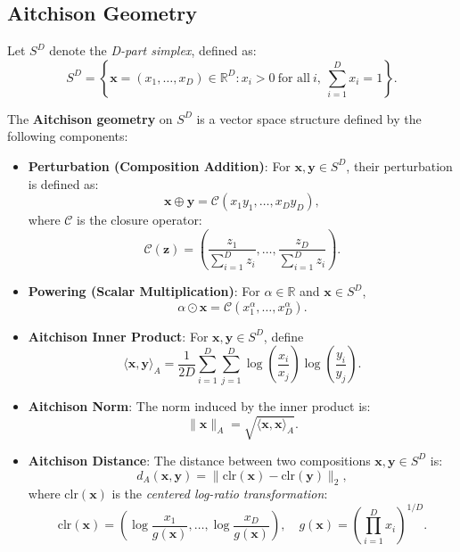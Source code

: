 \documentclass[article]{abntex2}
\begin{document}
\subsection*{Aitchison Geometry}

Let $S^D$ denote the \emph{D-part simplex}, defined as:
\[
S^D = \left\{ \mathbf{x} = (x_1, \dots, x_D) \in \mathbb{R}^D : x_i > 0 \ \text{for all} \ i, \ \sum_{i=1}^D x_i = 1 \right\}.
\]

The \textbf{Aitchison geometry} on $S^D$ is a vector space structure defined by the following components:

\begin{itemize}
    \item \textbf{Perturbation (Composition Addition)}: For $\mathbf{x}, \mathbf{y} \in S^D$, their perturbation is defined as:
    \[
    \mathbf{x} \oplus \mathbf{y} = \mathcal{C}(x_1 y_1, \dots, x_D y_D),
    \]
    where $\mathcal{C}$ is the closure operator:
    \[
    \mathcal{C}(\mathbf{z}) = \left( \frac{z_1}{\sum_{i=1}^D z_i}, \dots, \frac{z_D}{\sum_{i=1}^D z_i} \right).
    \]
    
    \item \textbf{Powering (Scalar Multiplication)}: For $\alpha \in \mathbb{R}$ and $\mathbf{x} \in S^D$,
    \[
    \alpha \odot \mathbf{x} = \mathcal{C}(x_1^\alpha, \dots, x_D^\alpha).
    \]
    
    \item \textbf{Aitchison Inner Product}: For $\mathbf{x}, \mathbf{y} \in S^D$, define
    \[
    \langle \mathbf{x}, \mathbf{y} \rangle_A = \frac{1}{2D} \sum_{i=1}^D \sum_{j=1}^D \log\left(\frac{x_i}{x_j}\right) \log\left(\frac{y_i}{y_j}\right).
    \]
    
    \item \textbf{Aitchison Norm}: The norm induced by the inner product is:
    \[
    \|\mathbf{x}\|_A = \sqrt{\langle \mathbf{x}, \mathbf{x} \rangle_A}.
    \]
    
    \item \textbf{Aitchison Distance}: The distance between two compositions $\mathbf{x}, \mathbf{y} \in S^D$ is:
    \[
    d_A(\mathbf{x}, \mathbf{y}) = \|\text{clr}(\mathbf{x}) - \text{clr}(\mathbf{y})\|_2,
    \]
    where $\text{clr}(\mathbf{x})$ is the \emph{centered log-ratio transformation}:
    \[
    \text{clr}(\mathbf{x}) = \left( \log\frac{x_1}{g(\mathbf{x})}, \dots, \log\frac{x_D}{g(\mathbf{x})} \right), \quad g(\mathbf{x}) = \left( \prod_{i=1}^D x_i \right)^{1/D}.
    \]
\end{itemize}
\end{document}
